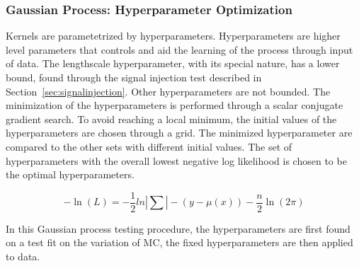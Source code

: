     \subsubsection{Gaussian Process: Hyperparameter Optimization}
    \label{sec:hyperparam}
    Kernels are parametetrized by hyperparameters. Hyperparameters are higher level parameters that controls and aid the learning of the process through input of data. The lengthscale hyperparameter, with its special nature, has a lower bound, found through the signal injection test described in Section~\ref{sec:signalinjection}. Other hyperparameters are not bounded. The minimization of the hyperparameters is performed through a scalar conjugate gradient search. To avoid reaching a local minimum, the initial values of the hyperparameters are chosen through a grid. The minimized hyperparameter are compared to the other sets with different initial values. The set of hyperparameters with the overall lowest negative log likelihood is chosen to be the optimal hyperparameters.

    \begin{equation}
        -\ln(L) = -\frac{1}{2} ln |\sum| - (y-\mu(x) ) - \frac{n}{2}\ln(2\pi)
    \label{eq:loglikelihood}
    \end{equation}
    

    In this Gaussian process testing procedure, the hyperparameters are first found on a test fit on the variation of MC, the fixed hyperparameters are then applied to data.
%

